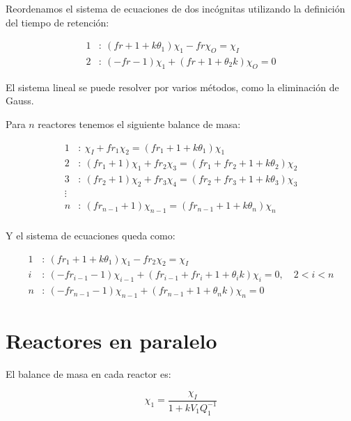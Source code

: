 \documentclass[11pt]{article}
\begin{document}
Reordenamos el sistema de ecuaciones de dos incógnitas utilizando la definición del tiempo de retención:

\[ \boxed{ \begin{aligned}
    1 & : \ \left( fr + 1 + k \theta_1 \right) \chi_1 - fr \chi_O = \chi_I \\
    2 & : \ \left( -fr - 1 \right) \chi_1 + \left( fr + 1 + \theta_2 k \right) \chi_O = 0
\end{aligned} } \]

El sistema lineal se puede resolver por varios métodos, como la eliminación de Gauss.

Para \( n \) reactores tenemos el siguiente balance de masa:

\[ \begin{aligned}
    1 & : \ \chi_I + fr_1 \chi_2 = \left( fr_1+ 1 + k \theta_1 \right) \chi_1 \\
    2 & : \ \left( fr_1 + 1 \right) \chi_1 + fr_2 \chi_3 = \left( fr_1 + fr_2 + 1 + k \theta_2 \right) \chi_2 \\
    3 & : \ \left( fr_2 + 1 \right) \chi_2 + fr_3 \chi_4 = \left( fr_2 + fr_3 + 1 + k \theta_3 \right) \chi_3 \\
    \vdots & \\
    n & : \ \left( fr_{ n - 1 } + 1 \right) \chi_{ n - 1 } = \left( fr_{ n - 1 } + 1 + k \theta_n \right) \chi_n \\
\end{aligned} \]

Y el sistema de ecuaciones queda como:

\[ \boxed{ \begin{aligned}
    1 & : \ \left( fr_1 + 1 + k \theta_1 \right) \chi_1 - fr_2 \chi_2 = \chi_I \\
    i & : \ \left( -fr_{ i - 1 } - 1 \right) \chi_{ i - 1 } + \left( fr_{ i - 1 } + fr_i + 1 + \theta_i k \right) \chi_i = 0, \quad 2 < i < n \\
    n & : \ \left( -fr_{ n - 1 } - 1 \right) \chi_{ n - 1 } + \left( fr_{ n - 1 } + 1 + \theta_n k \right) \chi_n = 0
\end{aligned} } \]

\section{Reactores en paralelo}

El balance de masa en cada reactor es:

\[ \chi_1 = \frac{ \chi_I }{ 1 + k V_1 Q_{1}^{-1} } \]
\end{document}
